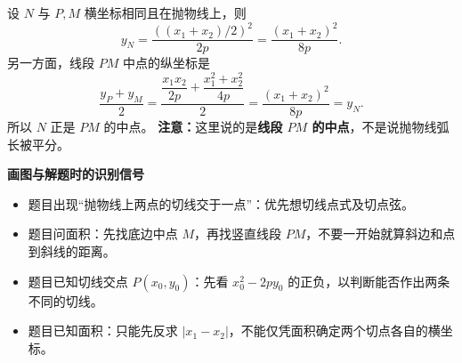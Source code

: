 \begin{explanationbox}
    

    设 $N$ 与 $P,M$ 横坐标相同且在抛物线上，则
    \[
        y_N=\frac{((x_1+x_2)/2)^2}{2p}
        =\frac{(x_1+x_2)^2}{8p}.
    \]
    另一方面，线段 $PM$ 中点的纵坐标是
    \[
        \frac{y_P+y_M}{2}
        =\frac{\dfrac{x_1x_2}{2p}+\dfrac{x_1^2+x_2^2}{4p}}2
        =\frac{(x_1+x_2)^2}{8p}=y_N.
    \]
    所以 $N$ 正是 $PM$ 的中点。
    \textbf{注意：}这里说的是\textbf{线段 $PM$ 的中点}，不是说抛物线弧长被平分。

    \medskip
    \textbf{\textcolor{CExplanation}{画图与解题时的识别信号}}
    \begin{itemize}[leftmargin=*, itemsep=0.4em, topsep=0.35em]
        \item 题目出现“抛物线上两点的切线交于一点”：优先想切线点式及切点弦。
        \item 题目问面积：先找底边中点 $M$，再找竖直线段 $PM$，不要一开始就算斜边和点到斜线的距离。
        \item 题目已知切线交点 $P(x_0,y_0)$：先看 $x_0^2-2py_0$ 的正负，以判断能否作出两条不同的切线。
        \item 题目已知面积：只能先反求 $|x_1-x_2|$，不能仅凭面积确定两个切点各自的横坐标。
    \end{itemize}
\end{explanationbox}
